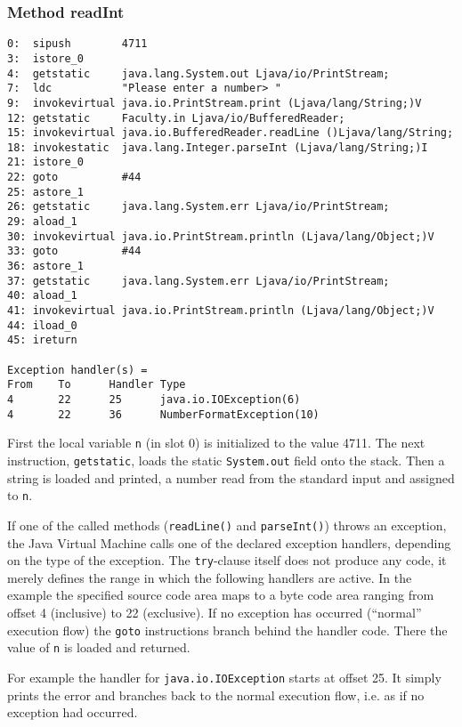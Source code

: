 \documentclass[12pt,twoside]{article}
\newcommand\jvm{{Java Virtual Machine }}
\begin{document}
\subsubsection{Method readInt}

{\small \begin{verbatim}
0:  sipush        4711
3:  istore_0
4:  getstatic     java.lang.System.out Ljava/io/PrintStream;
7:  ldc           "Please enter a number> "
9:  invokevirtual java.io.PrintStream.print (Ljava/lang/String;)V
12: getstatic     Faculty.in Ljava/io/BufferedReader;
15: invokevirtual java.io.BufferedReader.readLine ()Ljava/lang/String;
18: invokestatic  java.lang.Integer.parseInt (Ljava/lang/String;)I
21: istore_0
22: goto          #44
25: astore_1
26: getstatic     java.lang.System.err Ljava/io/PrintStream;
29: aload_1
30: invokevirtual java.io.PrintStream.println (Ljava/lang/Object;)V
33: goto          #44
36: astore_1
37: getstatic     java.lang.System.err Ljava/io/PrintStream;
40: aload_1
41: invokevirtual java.io.PrintStream.println (Ljava/lang/Object;)V 
44: iload_0
45: ireturn

Exception handler(s) = 
From    To      Handler Type
4       22      25      java.io.IOException(6)
4       22      36      NumberFormatException(10)
\end{verbatim}}

First the local variable \texttt{n}  (in slot 0) is initialized to the
value  4711.   The  next  instruction, \texttt{getstatic},  loads  the
static  \texttt{System.out} field onto  the stack.   Then a  string is
loaded and  printed, a number   read from the  standard input and
assigned to \texttt{n}.

If    one   of   the    called   methods    (\texttt{readLine()}   and
\texttt{parseInt()}) throws  an exception, the  \jvm calls one  of the
declared exception  handlers, depending on the type  of the exception.
The \texttt{try}-clause  itself does not  produce any code,  it merely
defines the range in which  the following handlers are active.  In the
example  the specified  source  code area  maps  to a  byte code  area
ranging from offset 4 (inclusive)  to 22 (exclusive).  If no exception
has   occurred   (``normal''   execution   flow)   the   \texttt{goto}
instructions  branch behind  the  handler code.   There  the value  of
\texttt{n} is loaded and returned.

For  example the handler   for \texttt{java.io.IOException}  starts at
offset 25. It simply prints the error  and branches back to the normal
execution flow, i.e. as if no exception had occurred.
\end{document}
